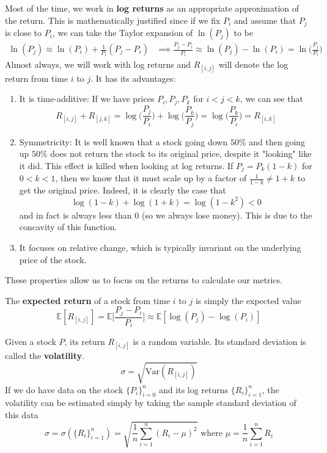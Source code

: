 \documentclass{article}
\begin{document}
Most of the time, we work in \textbf{log returns} as an appropriate approximation of the return. This is mathematically justified since if we fix $P_i$ and assume that $P_{j}$ is close to $P_i$, we can take the Taylor expansion of $\ln(P_j)$ to be 
\begin{align*}
    \ln(P_j) \approx \ln(P_i) + \frac{1}{P_i} (P_j - P_i) & \implies \frac{P_j - P_i}{P_i} \approx \ln(P_j) - \ln(P_i) = \ln \bigg(\frac{P_j}{P_i} \bigg)
\end{align*}
Almost always, we will work with log returns and $R_{[i, j]}$ will denote the log return from time $i$ to $j$. It has its advantages: 
\begin{enumerate}
    \item It is time-additive: If we have prices $P_i, P_j, P_k$ for $i < j < k$, we can see that 
    \[R_{[i, j]} + R_{[j, k]} = \log \bigg(\frac{P_j}{P_i}\bigg) + \log \bigg( \frac{P_k}{P_j} \bigg) = \log \bigg(\frac{P_k}{P_i} \bigg) = R_{[i, k]}\] 

    \item Symmetricity: It is well known that a stock going down $50\%$ and then going up $50\%$ does not return the stock to its original price, despite it "looking" like it did. This effect is killed when looking at log returns. If $P_j = P_k (1 - k)$ for $0 < k < 1$, then we know that it must scale up by a factor of $\frac{1}{1 - k} \neq 1 + k$ to get the original price. Indeed, it is clearly the case that 
    \[\log(1 - k) + \log(1 + k) = \log(1 - k^2) < 0\]
    and in fact is always less than $0$ (so we always lose money). This is due to the concavity of this function. 
    
    \item It focuses on relative change, which is typically invariant on the underlying price of the stock. 
\end{enumerate}

These properties allow us to focus on the returns to calculate our metrics. 

\begin{definition}
The \textbf{expected return} of a stock from time $i$ to $j$ is simply the expected value 
\[\mathbb{E}[R_{[i, j]}] = \mathbb{E} \bigg[ \frac{P_j - P_i}{P_i} \bigg] \approx \mathbb{E} [ \log(P_j) - \log(P_i) ] \]
\end{definition}

\begin{definition}
Given a stock $P$, its return $R_{[i, j]}$ is a random variable. Its standard deviation is called the \textbf{volatility}. 
\[\sigma = \sqrt{\mathrm{Var}(R_{[i, j]})}\]
If we do have data on the stock $\{P_i\}_{i=0}^n$ and its log returns $\{R_i\}_{i=1}^n$, the volatility can be estimated simply by taking the sample standard deviation of this data 
\[\sigma = \sigma(\{R_i\}_{i=1}^n) = \sqrt{\frac{1}{n} \sum_{i=1}^n (R_i - \mu)^2 } \text{ where } \mu = \frac{1}{n} \sum_{i=1}^n R_i\]
\end{definition}
\end{document}
